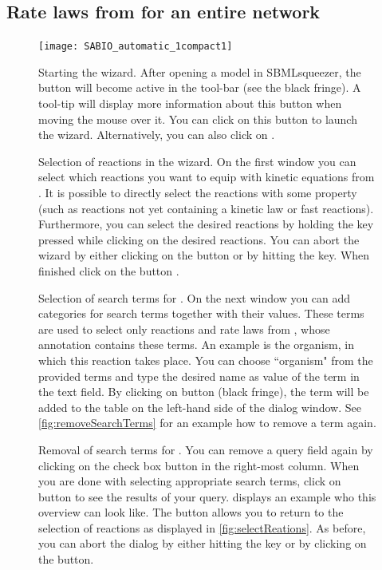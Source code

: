 \subsection{Rate laws from \SABIO for an entire network}
\label{sec:SABIOautomatic}

\begin{figure}
\texttt{[image: SABIO\_automatic\_1compact1]}
\caption[Starting the \SABIO wizard]{Starting the \SABIO wizard.
After opening a model in SBMLsqueezer, the \SABIO button will become active in the tool-bar (see the black fringe).
A tool-tip will display more information about this button when moving the mouse over it.
You can click on this button to launch the \SABIO wizard.
Alternatively, you can also click on .}
\label{fig:startAutomatic}
\end{figure}
\begin{figure}
\caption[Selection of reactions in the \SABIO wizard]{Selection of reactions in the \SABIO wizard.
On the first window you can select which reactions you want to equip with kinetic equations from \SABIO. It is possible to directly select the reactions with some property (such as reactions not yet containing a kinetic law or fast reactions).
Furthermore, you can select the desired reactions by holding the \keys{\ctrlwin} key pressed while clicking on the desired reactions.
You can abort the wizard by either clicking on the  button or by hitting the \keys{\escwin} key.
When finished click on the button .
\label{fig:selectReations}}
\end{figure}
\begin{figure}
\caption[Selection of search terms for \SABIO]{Selection of search terms for \SABIO.
On the next window you can add categories for search terms together with their values.
These terms are used to select only reactions and rate laws from \SABIO, whose annotation contains these terms.
An example is the organism, in which this reaction takes place.
You can choose ``organism" from the provided terms and type the desired name as value of the term in the text field.
By clicking on button  (black fringe), the term will be added to the table on the left-hand side of the dialog window.
See \vref{fig:removeSearchTerms} for an example how to remove a term again.}
\label{fig:searchTerms}
\end{figure}
\begin{figure}
\caption[Removal of search terms for \SABIO]{Removal of search terms for \SABIO.
You can remove a query field again by clicking on the check box button in the right-most column.
When you are done with selecting appropriate search terms, click on button  to see the results of your query.  displays an example who this overview can look like.
The  button allows you to return to the selection of reactions as displayed in \vref{fig:selectReations}.
As before, you can abort the dialog by either hitting the key \keys{\escwin} or by clicking on the  button.
\label{fig:removeSearchTerms}}
\end{figure}
